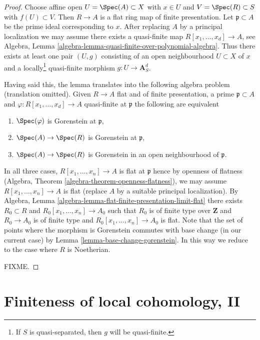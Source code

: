 \begin{proof}
Choose affine open $U = \Spec(A) \subset X$ with $x \in U$ and
$V = \Spec(R) \subset S$ with $f(U) \subset V$. Then $R \to A$
is a flat ring map of finite presentation. Let $\mathfrak p \subset A$
be the prime ideal corresponding to $x$. After replacing $A$ by a
principal localization we may assume there exists a quasi-finite map
$R[x_1, \ldots, x_d]  \to A$, see
Algebra, Lemma \ref{algebra-lemma-quasi-finite-over-polynomial-algebra}.
Thus there exists at least one pair $(U, g)$ consisting of an
open neighbourhood $U \subset X$ of $x$ and a locally\footnote{If $S$
is quasi-separated, then $g$ will be quasi-finite.} quasi-finite morphism
$g : U \to \mathbf{A}^d_S$.

\medskip\noindent
Having said this, the lemma translates into the following algebra
problem (translation omitted). Given $R \to A$ flat and of finite
presentation, a prime $\mathfrak p \subset A$ and
$\varphi : R[x_1, \ldots, x_d] \to A$ quasi-finite at $\mathfrak p$
the following are equivalent
\begin{enumerate}
\item $\Spec(\varphi)$ is Gorenstein at $\mathfrak p$,
\item $\Spec(A) \to \Spec(R)$ is Gorenstein at $\mathfrak p$,
\item $\Spec(A) \to \Spec(R)$ is Gorenstein in an open neighbourhood
of $\mathfrak p$.
\end{enumerate}
In all three cases, $R[x_1, \ldots, x_n] \to A$ is flat at $\mathfrak p$
hence by openness of flatness
(Algebra, Theorem \ref{algebra-theorem-openness-flatness}),
we may assume $R[x_1, \ldots, x_n] \to A$
is flat (replace $A$ by a suitable principal localization).
By Algebra, Lemma \ref{algebra-lemma-flat-finite-presentation-limit-flat}
there exists $R_0 \subset R$ and $R_0[x_1, \ldots, x_n] \to A_0$
such that $R_0$ is of finite type over $\mathbf{Z}$ and
$R_0 \to A_0$ is of finite type and $R_0[x_1, \ldots, x_n] \to A_0$ is flat.
Note that the set of points where the morphism is
Gorenstein commutes with base change (in our current case) by
Lemma \ref{lemma-base-change-gorenstein}.
In this way we reduce to the case where $R$ is Noetherian.

\medskip\noindent
FIXME.
\end{proof}










\section{Finiteness of local cohomology, II}
\label{section-finiteness-II}

